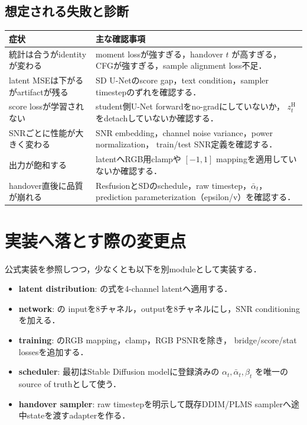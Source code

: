 \documentclass[11pt,a4paper]{ltjsarticle}
\begin{document}
\subsection{想定される失敗と診断}

\begin{table}[htbp]
  \small
  \centering
  \begin{tabularx}{\linewidth}{>{\raggedright\arraybackslash}p{.28\linewidth}X}
    \toprule
    症状 & 主な確認事項 \\
    \midrule
    統計は合うがidentityが変わる &
      moment lossが強すぎる，handover \(t\) が高すぎる，
      CFGが強すぎる，sample alignment loss不足．\\
    latent MSEは下がるがartifactが残る &
      SD U-Netのscore gap，text condition，sampler timestepのずれを確認する．\\
    score lossが学習されない &
      student側U-Net forwardをno-gradにしていないか，
      \(z_t^{\mathrm H}\) をdetachしていないか確認する．\\
    SNRごとに性能が大きく変わる &
      SNR embedding，channel noise variance，power normalization，
      train/test SNR定義を確認する．\\
    出力が飽和する &
      latentへRGB用clampや \([-1,1]\) mappingを適用していないか確認する．\\
    handover直後に品質が崩れる &
      ResfusionとSDのschedule，raw timestep，\(\bar\alpha_t\)，
      prediction parameterization（epsilon/v）を確認する．\\
    \bottomrule
  \end{tabularx}
\end{table}

\section{実装へ落とす際の変更点}

公式実装を参照しつつ，少なくとも以下を別moduleとして実装する．
\begin{itemize}
  \item \textbf{latent distribution}: 
         の式を4-channel latentへ適用する．
  \item \textbf{network}: 
         の
        inputを8チャネル，outputを8チャネルにし，SNR conditioningを加える．
  \item \textbf{training}: 
         のRGB mapping，clamp，RGB PSNRを除き，
        bridge/score/stat lossesを追加する．
  \item \textbf{scheduler}: 
        最初はStable Diffusion modelに登録済みの
        \(\alpha_t,\bar\alpha_t,\beta_t\) を唯一のsource of truthとして使う．
  \item \textbf{handover sampler}: 
        raw timestepを明示して既存DDIM/PLMS samplerへ途中stateを渡すadapterを作る．
\end{itemize}
\end{document}
